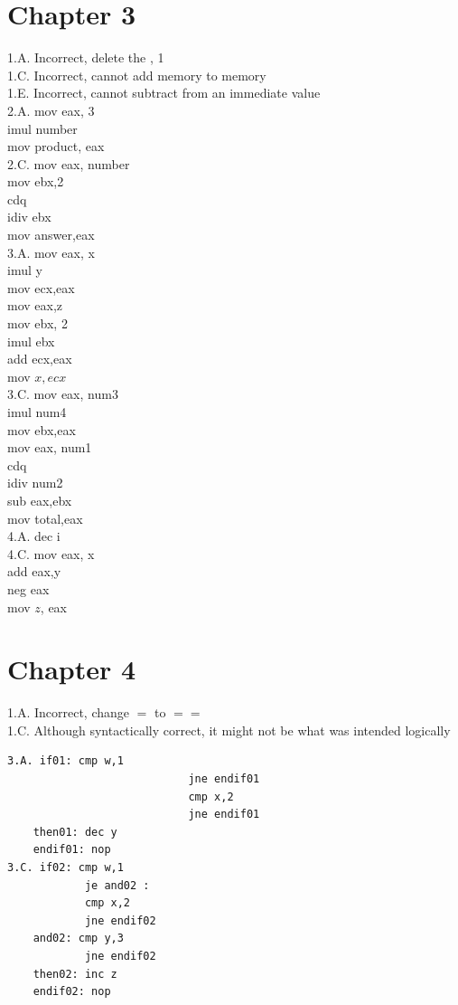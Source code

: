\documentclass[10pt]{book}
\begin{document}
\section{Chapter 3}
1.A. Incorrect, delete the , 1\\
1.C. Incorrect, cannot add memory to memory\\
1.E. Incorrect, cannot subtract from an immediate value\\
2.A. mov eax, 3\\
imul number\\
mov product, eax\\
2.C. mov eax, number\\
mov ebx,2\\
cdq\\
idiv ebx\\
mov answer,eax\\
3.A. mov eax, x\\
imul y\\
mov ecx,eax\\
mov eax,z\\
mov ebx, 2\\
imul ebx\\
add ecx,eax\\
mov $x, e c x$\\
3.C. mov eax, num3\\
imul num4\\
mov ebx,eax\\
mov eax, num1\\
cdq\\
idiv num2\\
sub eax,ebx\\
mov total,eax\\
4.A. dec i\\
4.C. mov eax, x\\
add eax,y\\
neg eax\\
mov $z$, eax

\section{Chapter 4}
1.A. Incorrect, change $=$ to $==$\\
1.C. Although syntactically correct, it might not be what was intended logically


\begin{verbatim}
3.A. if01: cmp w,1
                            jne endif01
                            cmp x,2
                            jne endif01
    then01: dec y
    endif01: nop
3.C. if02: cmp w,1
            je and02 :
            cmp x,2
            jne endif02
    and02: cmp y,3
            jne endif02
    then02: inc z
    endif02: nop
\end{verbatim}
\end{document}
